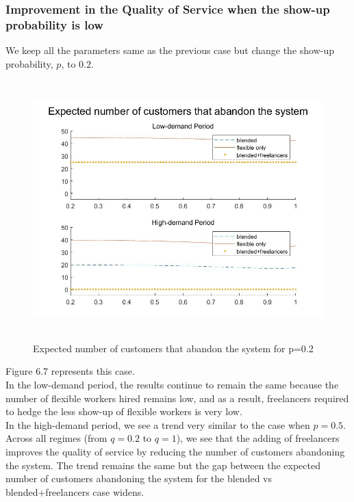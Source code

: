 \subsubsection{Improvement in the Quality of Service when the show-up probability is low}
We keep all the parameters same as the previous case but change the show-up probability, $p$, to $0.2$. \\
\begin{figure}[hbt!]
\includegraphics[height=10cm]{p0.2.jpg}
\caption{Expected number of customers that abandon the system for p=0.2}
\end{figure}
Figure 6.7 represents this case. \\ In the low-demand period, the results continue to remain the same because the number of flexible workers hired remains low, and as a result, freelancers required to hedge the less show-up of flexible workers is very low. \\ In the high-demand period, we see a trend very similar to the case when $p=0.5$. Across all regimes (from $q=0.2$ to $q=1$), we see that the adding of freelancers improves the quality of service by reducing the number of customers abandoning the system. The trend remains the same but the gap between the expected number of customers abandoning the system for the blended vs blended+freelancers case widens.
